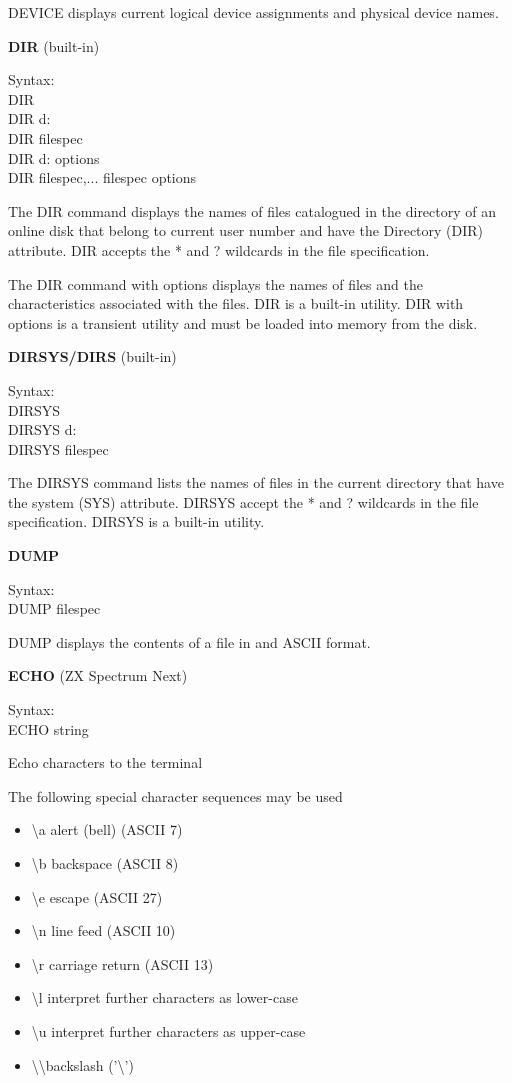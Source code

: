 DEVICE displays current logical device assignments and physical device
names.

\textbf{DIR} (built-in)

\hangindent=0.7cm Syntax:\\
DIR\\
DIR d:\\
DIR filespec\\
DIR d: options\\
DIR filespec,... filespec options

The DIR command displays the names of files catalogued in the
directory of an online disk that belong to current user number and
have the Directory (DIR) attribute. DIR accepts the * and ? wildcards
in the file specification.

The DIR command with options displays the names of files and the
characteristics associated with the files. DIR is a built-in
utility. DIR with options is a transient utility and must be loaded
into memory from the disk.

\textbf{DIRSYS/DIRS} (built-in)

\hangindent=0.7cm Syntax:\\
DIRSYS\\
DIRSYS d:\\
DIRSYS filespec

The DIRSYS command lists the names of files in the current directory
that have the system (SYS) attribute. DIRSYS accept the * and ?
wildcards in the file specification. DIRSYS is a built-in utility.

\textbf{DUMP}

\hangindent=0.7cm Syntax:\\
DUMP filespec

DUMP displays the contents of a file in and ASCII format.

\textbf{ECHO} (ZX Spectrum Next)

\hangindent=0.7cm Syntax:\\
ECHO string

Echo characters to the terminal

The following special character sequences may be used
\begin{itemize}
\item \textbackslash a alert (bell) (ASCII 7)
\item \textbackslash b backspace (ASCII 8)
\item \textbackslash e escape (ASCII 27)
\item \textbackslash n line feed (ASCII 10)
\item \textbackslash r carriage return (ASCII 13)
\item \textbackslash l interpret further characters as lower-case
\item \textbackslash u interpret further characters as upper-case
\item \textbackslash\textbackslash backslash ('\textbackslash')
\end{itemize}

